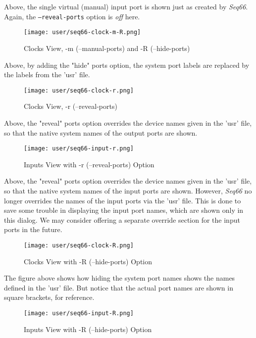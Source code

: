    Above, the single virtual (manual) input port is shown just as created by
   \textsl{Seq66}.
   Again, the \texttt{--reveal-ports} option is \textsl{off} here.

\begin{figure}[H]
   \centering 
   \texttt{[image: user/seq66-clock-m-R.png]}
   \caption{Clocks View, -m (--manual-ports) and -R (--hide-ports)}
   \label{fig:clock_m_R}
\end{figure}

   Above, by adding the "hide" ports option, the system port labels are
   replaced by the labels from the 'usr' file.

\begin{figure}[H]
   \centering 
   \texttt{[image: user/seq66-clock-r.png]}
   \caption{Clocks View, -r (--reveal-ports)}
   \label{fig:clock_r}
\end{figure}

   Above, the "reveal" ports option overrides the device names given in the
   'usr' file, so that the native system names of the output ports are shown.

\begin{figure}[H]
   \centering 
   \texttt{[image: user/seq66-input-r.png]}
   \caption{Inputs View with -r (--reveal-ports) Option}
   \label{fig:input_r}
\end{figure}

   Above, the "reveal" ports option overrides the device names given in the
   'usr' file, so that the native system names of the input ports are shown.
   However, \textsl{Seq66} no longer overrides the
   names of the input ports via the 'usr' file.  This is done to
   save some trouble in displaying the input port names, which are shown
   only in this dialog.  We may consider offering a separate override section
   for the input ports in the future.

\begin{figure}[H]
   \centering 
   \texttt{[image: user/seq66-clock-R.png]}
   \caption{Clocks View with -R (--hide-ports) Option}
   \label{fig:clock_R}
\end{figure}

   The figure above shows how hiding the system port names shows the names
   defined in the 'usr' file.  But notice that the actual port names are shown
   in square brackets, for reference.

\begin{figure}[H]
   \centering 
   \texttt{[image: user/seq66-input-R.png]}
   \caption{Inputs View with -R (--hide-ports) Option}
   \label{fig:input_R}
\end{figure}


